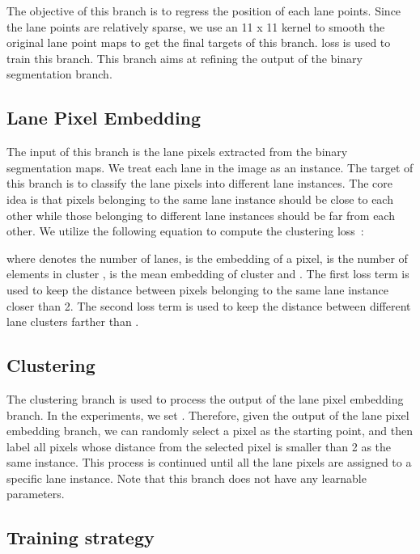 \documentclass[draftcls]{IEEEtran}
\begin{document}
The objective of this branch is to regress the position of each lane points. Since the lane points are relatively sparse, we use an 11 x 11 kernel to smooth the original lane point maps to get the final targets of this branch.  loss is used to train this branch. This branch aims at refining the output of the binary segmentation branch.

\subsection{Lane Pixel Embedding}

The input of this branch is the lane pixels extracted from the binary segmentation maps. We treat each lane in the image as an instance. The target of this branch is to classify the lane pixels into different lane instances. The core idea is that pixels belonging to the same lane instance should be close to each other while those belonging to different lane instances should be far from each other. We utilize the following equation to compute the clustering loss~\cite{neven2018towards}:





where  denotes the number of lanes,  is the embedding of a pixel,  is the number of elements in cluster ,  is the mean embedding of cluster  and . The first loss term  is used to keep the distance between pixels belonging to the same lane instance closer than 2. The second loss term  is used to keep the distance between different lane clusters farther than . 

\subsection{Clustering}

The clustering branch is used to process the output of the lane pixel embedding branch. In the experiments, we set . Therefore, given the output of the lane pixel embedding branch, we can randomly select a pixel as the starting point, and then label all pixels whose distance from the selected pixel is smaller than 2 as the same instance. This process is continued until all the lane pixels are assigned to a specific lane instance. Note that this branch does not have any learnable parameters. 

\subsection{Training strategy}
\end{document}
